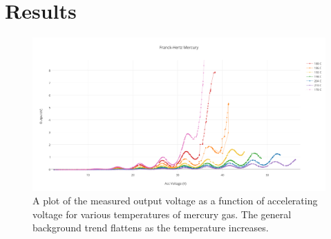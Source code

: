 \documentclass[prb,preprint]{revtex4-1}
\begin{document}
\section{Results}
\begin{figure}[h!]
\centering
\includegraphics[width=6in]{alltemps.pdf}
\caption{A plot of the measured output voltage as a function of accelerating voltage for various temperatures of mercury gas. The general background trend flattens as the temperature increases.}
\label{alltemps}
\end{figure}
\end{document}
